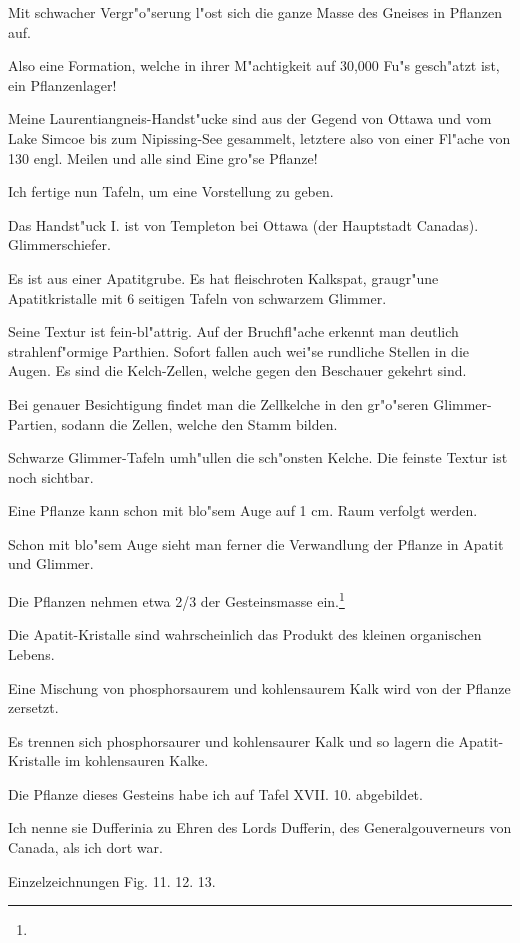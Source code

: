 \documentclass[a4paper, 11pt, oneside, german]{article}
\begin{document}
Mit schwacher Vergr"o"serung l"ost sich die ganze Masse des Gneises in Pflanzen auf.

Also eine Formation, welche in ihrer M"achtigkeit auf 30,000 Fu"s gesch"atzt ist, ein Pflanzenlager!

Meine Laurentiangneis-Handst"ucke sind aus der Gegend von Ottawa und vom Lake Simcoe bis zum Nipissing-See gesammelt, letztere also von einer Fl"ache von 130 engl. Meilen und alle sind Eine gro"se Pflanze!

Ich fertige nun Tafeln, um eine Vorstellung zu geben.

Das Handst"uck I. ist von Templeton bei Ottawa (der Hauptstadt Canadas). Glimmerschiefer.

Es ist aus einer Apatitgrube. Es hat fleischroten Kalkspat, graugr"une Apatitkristalle mit 6 seitigen Tafeln von schwarzem Glimmer.

Seine Textur ist fein-bl"attrig. Auf der Bruchfl"ache erkennt man deutlich strahlenf"ormige Parthien. Sofort fallen auch wei"se rundliche Stellen in die Augen. Es sind die Kelch-Zellen, welche gegen den Beschauer gekehrt sind.

Bei genauer Besichtigung findet man die Zellkelche in den gr"o"seren Glimmer-Partien, sodann die Zellen, welche den Stamm bilden.

Schwarze Glimmer-Tafeln umh"ullen die sch"onsten Kelche. Die feinste Textur ist noch sichtbar.

Eine Pflanze kann schon mit blo"sem Auge auf 1 cm. Raum verfolgt werden.

Schon mit blo"sem Auge sieht man ferner die Verwandlung der Pflanze in Apatit und Glimmer.

Die Pflanzen nehmen etwa 2/3 der Gesteinsmasse ein.\footnote{}

Die Apatit-Kristalle sind wahrscheinlich das Produkt des kleinen organischen Lebens.

Eine Mischung von phosphorsaurem und kohlensaurem Kalk wird von der Pflanze zersetzt.

Es trennen sich phosphorsaurer und kohlensaurer Kalk und so lagern die Apatit-Kristalle im kohlensauren Kalke.

Die Pflanze dieses Gesteins habe ich auf Tafel XVII. 10. abgebildet.

Ich nenne sie Dufferinia zu Ehren des Lords Dufferin, des Generalgouverneurs von Canada, als ich dort war.

Einzelzeichnungen Fig. 11. 12. 13.
\end{document}
